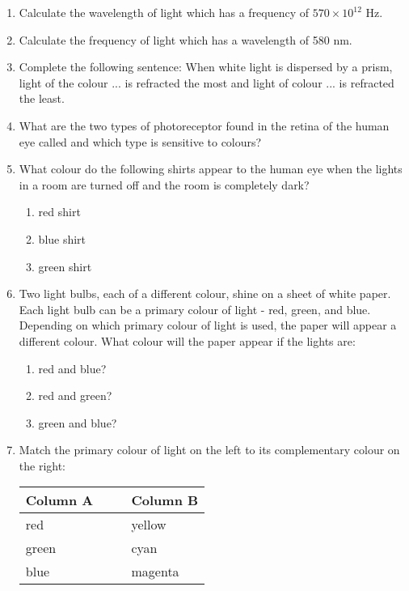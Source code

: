 \begin{eocexercises}{}
\begin{enumerate}

\item{Calculate the wavelength of light which has a frequency of $570 \times 10^{12}$ Hz.}

\item{Calculate the frequency of light which has a wavelength of 580 nm.}

\item{Complete the following sentence: When white light is dispersed by a prism, light of the colour ... is refracted the most and light of colour ... is refracted the least.}

\item{What are the two types of photoreceptor found in the retina of the human eye called and which type is sensitive to colours?}

\item{What colour do the following shirts appear to the human eye when the lights in a room are turned off and the room is completely dark?
\begin{enumerate}
\item{red shirt}
\item{blue shirt}
\item{green shirt}
\end{enumerate}}
\item{Two light bulbs, each of a different colour, shine on a sheet of white paper. Each light bulb can be a primary colour of light - red, green, and blue. Depending on which primary colour of light is used, the paper will appear a different colour. What colour will the paper appear if the lights are:
\begin{enumerate}
\item{red and blue?}
\item{red and green?}
\item{green and blue?}
\end{enumerate}}

\item{
Match the primary colour of light on the left to its complementary colour on the right:
\begin{center}
\begin{tabular}{ll}
\textbf{Column A} & \textbf{Column B} \\ \hline
red   \ \ \ & yellow \\
green \ \ \ \ \ \ \ \ \ & cyan \\
blue  \ \ \ & magenta \\
\end{tabular}
\end{center}
} 


\end{enumerate}
\end{eocexercises}
